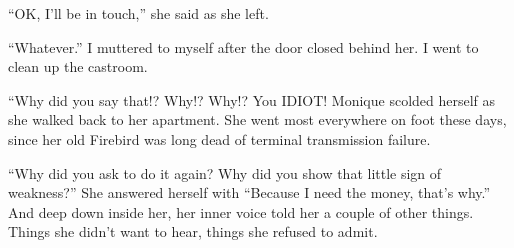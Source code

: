 ``OK, I'll be in touch,'' she said as she left.

``Whatever.'' I muttered to myself after the door closed behind her. I went to clean up the
castroom.

\begin{thought}
``Why did you say that!? Why!? Why!? You IDIOT! Monique scolded herself as she walked back
to her apartment. She went most everywhere on foot these days, since her old Firebird was long
dead of terminal transmission failure.

``Why did you ask to do it again? Why did you show that little sign of weakness?'' She
answered herself with ``Because I need the money, that's why.'' And deep down inside her, her
inner voice told her a couple of other things. Things she didn't want to hear, things she
refused to admit.
\end{thought}
